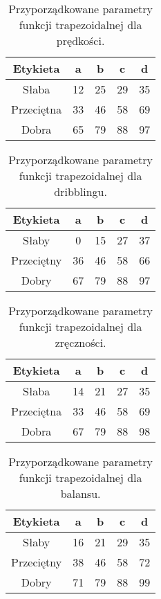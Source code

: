 \documentclass{classrep}
\begin{document}
\begin{table}[H]
	\centering
	\begin{tabular}{c c c c c} 
		\hline
		\textbf{Etykieta} & \textbf{a} & \textbf{b} & \textbf{c} &  \textbf{d} \\ [0.5ex] 
		\hline
		\hline 
		Słaba & 12 & 25 & 29 & 35 \\ 
		Przeciętna & 33 & 46 & 58 & 69 \\
		Dobra & 65 & 79 & 88 & 97 \\
		\hline
	\end{tabular}
	\caption{Przyporządkowane parametry funkcji trapezoidalnej dla prędkości.}
\end{table}

\begin{table}[H]
	\centering
	\begin{tabular}{c c c c c} 
		\hline
		\textbf{Etykieta} & \textbf{a} & \textbf{b} & \textbf{c} &  \textbf{d} \\ [0.5ex] 
		\hline
		\hline 
		Słaby & 0 & 15 & 27 & 37 \\ 
		Przeciętny & 36 & 46 & 58 & 66 \\
		Dobry & 67 & 79 & 88 & 97 \\
		\hline
	\end{tabular}
	\caption{Przyporządkowane parametry funkcji trapezoidalnej dla dribblingu.}
\end{table}

\begin{table}[H]
	\centering
	\begin{tabular}{c c c c c} 
		\hline
		\textbf{Etykieta} & \textbf{a} & \textbf{b} & \textbf{c} &  \textbf{d} \\ [0.5ex] 
		\hline
		\hline 
		Słaba & 14 & 21 & 27 & 35 \\ 
		Przeciętna & 33 & 46 & 58 & 69 \\
		Dobra & 67 & 79 & 88 & 98 \\
		\hline
	\end{tabular}
	\caption{Przyporządkowane parametry funkcji trapezoidalnej dla zręczności.}
\end{table}

\begin{table}[H]
	\centering
	\begin{tabular}{c c c c c} 
		\hline
		\textbf{Etykieta} & \textbf{a} & \textbf{b} & \textbf{c} &  \textbf{d} \\ [0.5ex] 
		\hline
		\hline 
		Słaby & 16 & 21 & 29 & 35 \\ 
		Przeciętny & 38 & 46 & 58 & 72 \\
		Dobry & 71 & 79 & 88 & 99 \\
		\hline
	\end{tabular}
	\caption{Przyporządkowane parametry funkcji trapezoidalnej dla balansu.}
\end{table}
\end{document}
